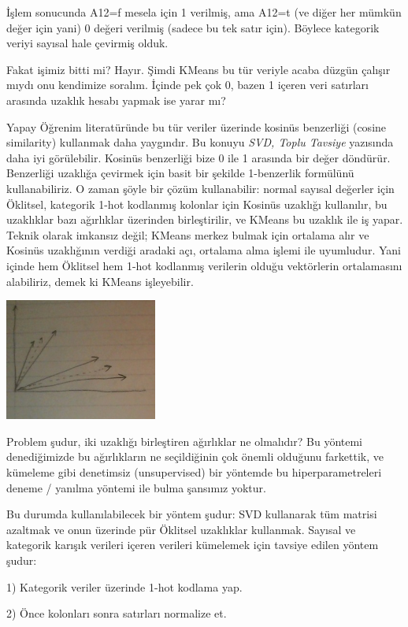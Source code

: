 \documentclass[12pt,fleqn]{article}\usepackage{../../common}
\begin{document}
İşlem sonucunda A12=f mesela için 1 verilmiş, ama A12=t (ve diğer her
mümkün değer için yani) 0 değeri verilmiş (sadece bu tek satır
için). Böylece kategorik veriyi sayısal hale çevirmiş olduk.

Fakat işimiz bitti mi? Hayır. Şimdi KMeans bu tür veriyle acaba düzgün
çalışır mıydı onu kendimize soralım. İçinde pek çok 0, bazen 1 içeren 
veri satırları arasında uzaklık hesabı yapmak ise yarar mı?

Yapay Öğrenim literatüründe bu tür veriler üzerinde kosinüs benzerliği
(cosine similarity) kullanmak daha yaygındır. Bu konuyu {\em SVD, Toplu
  Tavsiye} yazısında daha iyi görülebilir. Kosinüs benzerliği bize 0 ile 1
arasında bir değer döndürür. Benzerliği uzaklığa çevirmek için basit bir
şekilde 1-benzerlik formülünü kullanabiliriz. O zaman şöyle bir çözüm
kullanabilir: normal sayısal değerler için Öklitsel, kategorik 1-hot
kodlanmış kolonlar için Kosinüs uzaklığı kullanılır, bu uzaklıklar bazı
ağırlıklar üzerinden birleştirilir, ve KMeans bu uzaklık ile iş
yapar. Teknik olarak imkansız değil; KMeans merkez bulmak için ortalama
alır ve Kosinüs uzaklığının verdiği aradaki açı, ortalama alma işlemi ile
uyumludur. Yani içinde hem Öklitsel hem 1-hot kodlanmış verilerin olduğu
vektörlerin ortalamasını alabiliriz, demek ki KMeans işleyebilir.

\includegraphics[height=4cm]{kmeans_5.jpg}

Problem şudur, iki uzaklığı birleştiren ağırlıklar ne olmalıdır?  Bu
yöntemi denediğimizde bu ağırlıkların ne seçildiğinin çok önemli olduğunu
farkettik, ve kümeleme gibi denetimsiz (unsupervised) bir yöntemde bu
hiperparametreleri deneme / yanılma yöntemi ile bulma şansımız yoktur.

Bu durumda kullanılabilecek bir yöntem şudur: SVD kullanarak tüm matrisi
azaltmak ve onun üzerinde pür Öklitsel uzaklıklar kullanmak. Sayısal ve
kategorik karışık verileri içeren verileri kümelemek için tavsiye edilen
yöntem şudur:

1) Kategorik veriler üzerinde 1-hot kodlama yap. 

2) Önce kolonları sonra satırları normalize et.
\end{document}
